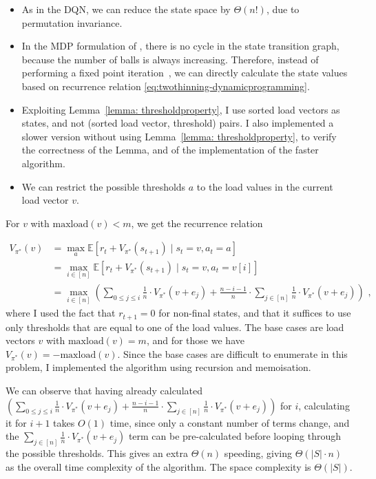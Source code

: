 \begin{itemize}
    \item 
    As in the DQN, we can reduce the state space by $\Theta(n!)$, due to permutation invariance.
    \item
    In the MDP formulation of \TwoThinning, there is no cycle in the state transition graph, because the number of balls is always increasing. Therefore, instead of performing a fixed point iteration~\cite{rhoades1991fixedpointiteration}, we can directly calculate the state values based on recurrence relation \eqref{eq:twothinning-dynamicprogramming}.
    \item
    Exploiting Lemma~\ref{lemma: thresholdproperty}, I use sorted load vectors as states, and not (sorted load vector, threshold) pairs. I also implemented a slower version without using Lemma~\ref{lemma: thresholdproperty}, to verify the correctness of the Lemma, and of the implementation of the faster algorithm.
    \item
    We can restrict the possible thresholds $a$ to the load values in the current load vector $v$. 
\end{itemize}


For $v$ with $\mathrm{maxload}(v)<m$, we get the recurrence relation

\begin{equation} \label{eq:twothinning-dynamicprogramming}
\begin{split}
    V_{\pi^*}(v) &= \max_a \mathbb{E} [r_t + V_{\pi^*}(s_{t+1}) \mid s_t=v, a_t=a] \\
    &= \max_{i \in [n]} \mathbb{E} [r_t + V_{\pi^*}(s_{t+1}) \mid s_t=v, a_t=v[i]] \\
    &= \max_{i \in [n]} \left(\sum_{0\leq j \leq i} \frac{1}{n}\cdot V_{\pi^*}(v+e_j) + \frac{n-i-1}{n} \cdot  \sum_{j \in [n]} \frac{1}{n}\cdot V_{\pi^*}(v+e_j) \right) \text{ ,}
\end{split}
\end{equation}
where I used the fact that $r_{t+1}=0$ for non-final states, and that it suffices to use only thresholds that are equal to one of the load values. The base cases are load vectors $v$ with $\mathrm{maxload}(v)=m$, and for those we have $V_{\pi^*}(v)=-\mathrm{maxload}(v)$. Since the base cases are difficult to enumerate in this problem, I implemented the algorithm using recursion and memoisation. 


We can observe that having already calculated $(\sum_{0\leq j \leq i} \frac{1}{n}\cdot V_{\pi^*}(v+e_j) + \frac{n-i-1}{n} \cdot  \sum_{j \in [n]} \frac{1}{n}\cdot V_{\pi^*}(v+e_j))$ for $i$, calculating it for $i+1$ takes $O(1)$ time, since only a constant number of terms change, and the $\sum_{j \in [n]} \frac{1}{n}\cdot V_{\pi^*}(v+e_j)$ term can be pre-calculated before looping through the possible thresholds. This gives an extra $\Theta(n)$ speeding, giving $\Theta(|S|\cdot n)$ as the overall time complexity of the algorithm. The space complexity is $\Theta(|S|)$.\\


